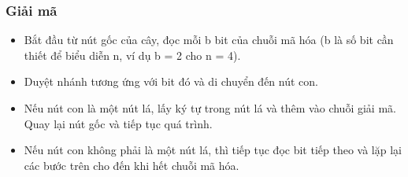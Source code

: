 \subsubsection{Giải mã}

\begin{itemize}
    \item Bắt đầu từ nút gốc của cây, đọc mỗi b bit của chuỗi mã hóa (b là số bit cần thiết để biểu diễn n, ví dụ b = 2 cho n = 4).
    \item Duyệt nhánh tương ứng với bit đó và di chuyển đến nút con.
    \item Nếu nút con là một nút lá, lấy ký tự trong nút lá và thêm vào chuỗi giải mã. Quay lại nút gốc và tiếp tục quá trình.
    \item Nếu nút con không phải là một nút lá, thì tiếp tục đọc bit tiếp theo và lặp lại các bước trên cho đến khi hết chuỗi mã hóa.
\end{itemize}

